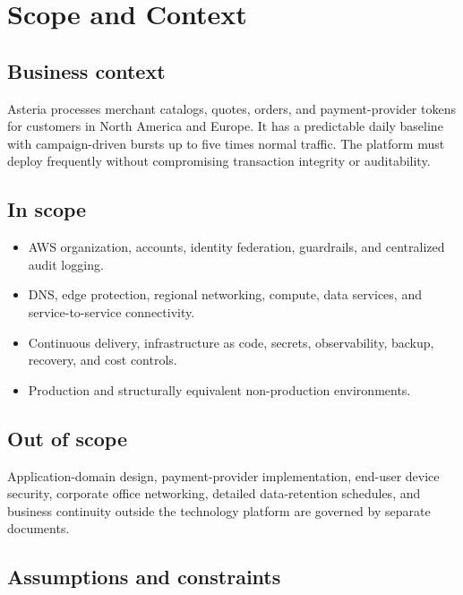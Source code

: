 \section{Scope and Context}

\subsection{Business context}

Asteria processes merchant catalogs, quotes, orders, and payment-provider tokens for customers in North America and Europe. It has a predictable daily baseline with campaign-driven bursts up to five times normal traffic. The platform must deploy frequently without compromising transaction integrity or auditability.

\subsection{In scope}

\begin{itemize}
  \item AWS organization, accounts, identity federation, guardrails, and centralized audit logging.
  \item DNS, edge protection, regional networking, compute, data services, and service-to-service connectivity.
  \item Continuous delivery, infrastructure as code, secrets, observability, backup, recovery, and cost controls.
  \item Production and structurally equivalent non-production environments.
\end{itemize}

\subsection{Out of scope}

Application-domain design, payment-provider implementation, end-user device security, corporate office networking, detailed data-retention schedules, and business continuity outside the technology platform are governed by separate documents.

\subsection{Assumptions and constraints}

